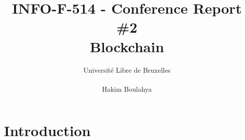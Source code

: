 \documentclass[10pt,a4paper]{article}
\title{INFO-F-514 - Conference Report \#2 \\
Blockchain}
\author{Université Libre de Bruxelles \\
\\ Hakim Boulahya}
\begin{document}
\maketitle


\section{Introduction}



\end{document}
